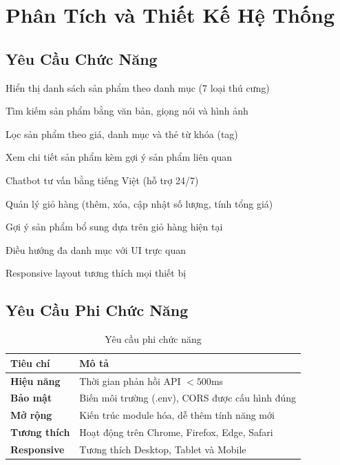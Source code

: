 \documentclass[12pt, a4paper]{report}
\begin{document}
\chapter{Phân Tích và Thiết Kế Hệ Thống}

\section{Yêu Cầu Chức Năng}

\begin{enumerate}[leftmargin=*, label=\textbf{[\arabic*]}]
    \item Hiển thị danh sách sản phẩm theo danh mục (7 loại thú cưng)
    \item Tìm kiếm sản phẩm bằng văn bản, giọng nói và hình ảnh
    \item Lọc sản phẩm theo giá, danh mục và thẻ từ khóa (tag)
    \item Xem chi tiết sản phẩm kèm gợi ý sản phẩm liên quan
    \item Chatbot tư vấn bằng tiếng Việt (hỗ trợ 24/7)
    \item Quản lý giỏ hàng (thêm, xóa, cập nhật số lượng, tính tổng giá)
    \item Gợi ý sản phẩm bổ sung dựa trên giỏ hàng hiện tại
    \item Điều hướng đa danh mục với UI trực quan
    \item Responsive layout tương thích mọi thiết bị
\end{enumerate}

\section{Yêu Cầu Phi Chức Năng}

\begin{table}[H]
    \centering
    \caption{Yêu cầu phi chức năng}
    \begin{tabular}{>{\bfseries}p{3.5cm}p{9.5cm}}
        \toprule
        Tiêu chí & Mô tả \\
        \midrule
        Hiệu năng    & Thời gian phản hồi API $< 500$ms \\
        Bảo mật      & Biến môi trường (.env), CORS được cấu hình đúng \\
        Mở rộng     & Kiến trúc module hóa, dễ thêm tính năng mới \\
        Tương thích  & Hoạt động trên Chrome, Firefox, Edge, Safari \\
        Responsive   & Tương thích Desktop, Tablet và Mobile \\
        \bottomrule
    \end{tabular}
\end{table}
\end{document}
